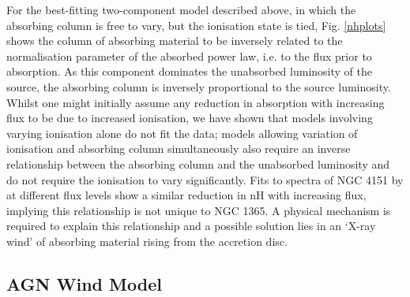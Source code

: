 \documentclass[useAMS,usenatbib]{sam}
\begin{document}
For the best-fitting two-component model described above, in which the absorbing column is free to vary, but the ionisation state is tied, Fig. \ref{nhplots} shows the
column of absorbing material to be inversely related to the normalisation parameter of the absorbed power law, i.e. to the flux prior to absorption. As this component
dominates the unabsorbed luminosity of the source, the absorbing column is inversely proportional to the source luminosity. Whilst one might initially assume any
reduction in absorption with increasing flux to be due to increased ionisation, we have shown that models involving varying ionisation alone do not fit the data; models
allowing variation of ionisation and absorbing column simultaneously also require an inverse relationship between the absorbing column and the unabsorbed luminosity and
do not require the ionisation to vary significantly. Fits to spectra of NGC 4151 by \citet{lubinski10} at different flux levels show a similar reduction in nH with
increasing flux, implying this relationship is not unique to NGC 1365. A physical mechanism is required to explain this relationship and a possible solution lies in an
`X-ray wind’ of absorbing material rising from the accretion disc.

\subsection{AGN Wind Model}

\end{document}
